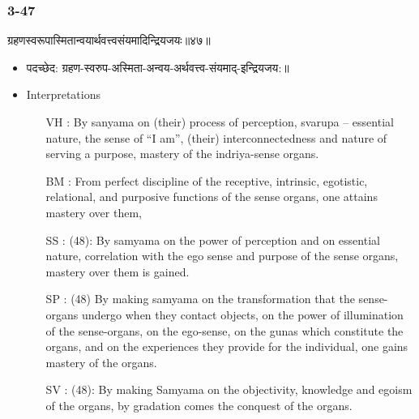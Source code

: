 \begin{frame}[fragile]\frametitle{3-47}
\begin{sanskrit}
ग्रहणस्वरूपास्मितान्वयार्थवत्त्वसंयमादिन्द्रियजयः॥४७॥
\end{sanskrit}

	\begin{itemize}
	\item पदच्छेद:  ग्रहण-स्वरुप-अस्मिता-अन्वय-अर्थवत्त्व-संयमाद्-इन्द्रियजय:॥
	\item Interpretations
		\begin{itemize}	
		\item [VH]: By sanyama on (their) process of perception, svarupa – essential nature, the sense of “I am”, (their) interconnectedness and nature of serving a purpose, mastery of the indriya-sense organs.
		\item [BM]: From perfect discipline of the receptive, intrinsic, egotistic, relational, and purposive functions of the sense organs, one attains mastery over them,
		\item [SS]: (48): By samyama on the power of perception and on essential nature, correlation with the ego sense and purpose of the sense organs, mastery over them is gained.
		\item [SP]: (48) By making samyama on the transformation that the sense-organs undergo when they contact objects, on the power of illumination of the sense-organs, on the ego-sense, on the gunas which constitute the organs, and on the experiences they provide for the individual, one gains mastery of the organs.
		\item [SV]: (48): By making Samyama on the objectivity, knowledge and egoism of the organs, by gradation comes the conquest of the organs. 
		\end{itemize}
	\end{itemize}
\end{frame}


